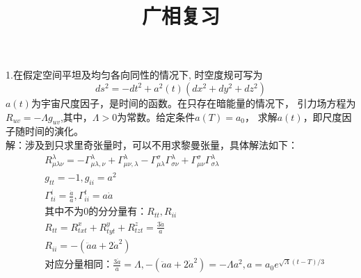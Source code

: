 \documentclass[UTF8]{ctexart}
\begin{document}
\title{广相复习}
\author{}
\date{}
\maketitle
1.在假定空间平坦及均匀各向同性的情况下, 时空度规可写为
$$
     d s^{2}=-d t^{2}+a^{2}(t)\left(d x^{2}+d y^{2}+d z^{2}\right)
$$
$a(t)$为宇宙尺度因子，是时间的函数。在只存在暗能量的情况下，
引力场方程为$R_{uv}=-\Lambda g_{uv}$,其中，$\Lambda>0$为常数。给定条件$a(T)=a_0$，
求解$a(t)$，即尺度因子随时间的演化。\\
解：涉及到只求里奇张量时，可以不用求黎曼张量，具体解法如下：
\begin{align*}
      & R_{\mu \lambda \nu}^{\lambda}=-\Gamma _{\mu \lambda ,\nu}^{\lambda}+\Gamma_{\mu \nu ,\lambda}^{\lambda}-\Gamma_{\mu \lambda}^{\sigma}
     \Gamma_{\sigma \nu }^{\lambda}+\Gamma_{\mu \nu}^{\sigma}\Gamma_{\sigma \lambda}^{\lambda}                                                \\
      & g_{tt}=-1,g_{ii}=a^2                                                                                                                  \\
      & \Gamma_{ti}^{i}=\frac{\dot{a}}{a},\Gamma_{ii}^t=a\dot{a}                                                                              \\
      & \text{其中不为0的分分量有：}R_{tt},R_{ii}                                                                                             \\
      & R_{tt}=R_{txt}^{x}+R_{tyt}^{y}+R_{tzt}^{z}=\frac{3\ddot{a}}{a}                                                                        \\
      & R_{ii}=-(\ddot{a}a+2\dot{a}^2)                                                                                                        \\
      & \text{对应分量相同：}\frac{3\ddot{a}}{a}=\Lambda,-(\ddot{a}a+2\dot{a}^2)=-\Lambda a^2,a=a_0e^{\sqrt{\Lambda} (t-T)/3}
\end{align*}
\end{document}
